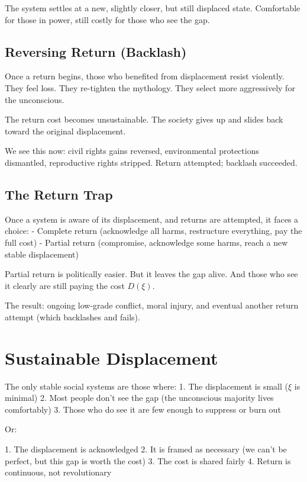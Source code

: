 \documentclass[12pt]{article}
\begin{document}
The system settles at a new, slightly closer, but still displaced state. Comfortable for those in power, still costly for those who see the gap.

\subsection{Reversing Return (Backlash)}

Once a return begins, those who benefited from displacement resist violently. They feel loss. They re-tighten the mythology. They select more aggressively for the unconscious.

The return cost becomes unsustainable. The society gives up and slides back toward the original displacement.

We see this now: civil rights gains reversed, environmental protections dismantled, reproductive rights stripped. Return attempted; backlash succeeded.

\subsection{The Return Trap}

Once a system is aware of its displacement, and returns are attempted, it faces a choice:
- Complete return (acknowledge all harms, restructure everything, pay the full cost)
- Partial return (compromise, acknowledge some harms, reach a new stable displacement)

Partial return is politically easier. But it leaves the gap alive. And those who see it clearly are still paying the cost $D(\xi)$.

The result: ongoing low-grade conflict, moral injury, and eventual another return attempt (which backlashes and fails).

\section{Sustainable Displacement}

The only stable social systems are those where:
1. The displacement is small ($\xi$ is minimal)
2. Most people don't see the gap (the unconscious majority lives comfortably)
3. Those who do see it are few enough to suppress or burn out

Or:

1. The displacement is acknowledged
2. It is framed as necessary (we can't be perfect, but this gap is worth the cost)
3. The cost is shared fairly
4. Return is continuous, not revolutionary
\end{document}
